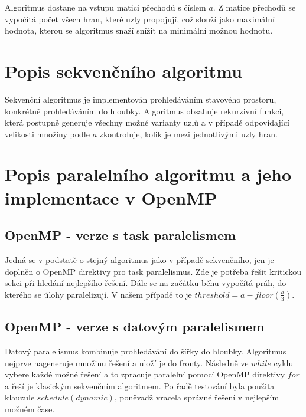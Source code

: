 \documentclass[a4paper, 12pt]{article}
\begin{document}
Algoritmus dostane na vstupu matici přechodů s číslem $a$. Z matice přechodů se vypočítá počet všech hran, které uzly propojují, což slouží jako maximální hodnota, kterou se algoritmus snaží snížit na minimální možnou hodnotu.

\section{Popis sekvenčního algoritmu}

Sekvenční algoritmus je implementován prohledáváním stavového prostoru, konkrétně prohledáváním do hloubky. Algoritmus obsahuje rekurzivní funkci, která postupně generuje všechny možné varianty uzlů a v případě odpovídající velikosti množiny podle $a$ zkontroluje, kolik je mezi jednotlivými uzly hran.

\begin{algorithm}[H]
\end{algorithm}

\section{Popis paralelního algoritmu a jeho implementace v OpenMP}

\subsection{OpenMP - verze s task paralelismem}

Jedná se v podstatě o stejný algoritmus jako v případě sekvenčního, jen je doplněn o OpenMP direktivy pro task paralelismus. Zde je potřeba řešit kritickou sekci při hledání nejlepšího řešení. Dále se na začátku běhu vypočítá práh, do kterého se úlohy paralelizují. V našem případě to je $threshold = a - floor(\frac{a}{3})$.

\subsection{OpenMP - verze s datovým paralelismem}

Datový paralelismus kombinuje prohledávání do šířky do hloubky. Algoritmus nejprve nageneruje množinu řešení a uloží je do fronty. Následně ve $while$ cyklu vybere každé možné řešení a to zpracuje paralelní pomocí OpenMP direktivy $for$ a řeší je klasickým sekvenčním algoritmem. Po řadě testování byla použita klauzule $schedule(dynamic)$, poněvadž vracela správné řešení v nejlepším možném čase.
\end{document}
